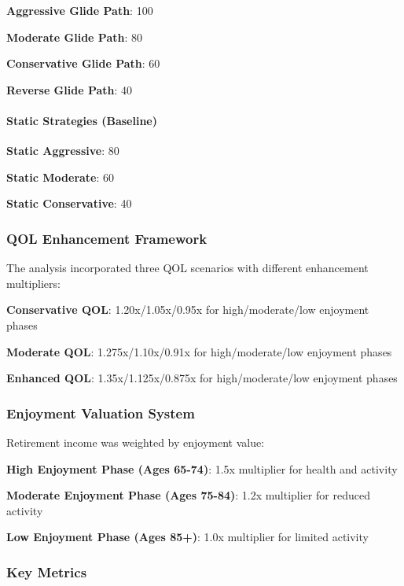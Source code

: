 \documentclass[11pt,letterpaper]{article}
\begin{document}
{{{\item \textbf{Aggressive Glide Path}: 100%
\item \textbf{Moderate Glide Path}: 80%
\item \textbf{Conservative Glide Path}: 60%
\item \textbf{Reverse Glide Path}: 40%

\paragraph{Static Strategies (Baseline)}

\item \textbf{Static Aggressive}: 80%
\item \textbf{Static Moderate}: 60%
\item \textbf{Static Conservative}: 40%

\subsubsection{QOL Enhancement Framework}

The analysis incorporated three QOL scenarios with different enhancement multipliers:

\item \textbf{Conservative QOL}: 1.20x/1.05x/0.95x for high/moderate/low enjoyment phases
\item \textbf{Moderate QOL}: 1.275x/1.10x/0.91x for high/moderate/low enjoyment phases
\item \textbf{Enhanced QOL}: 1.35x/1.125x/0.875x for high/moderate/low enjoyment phases

\subsubsection{Enjoyment Valuation System}

Retirement income was weighted by enjoyment value:

\item \textbf{High Enjoyment Phase (Ages 65-74)}: 1.5x multiplier for health and activity
\item \textbf{Moderate Enjoyment Phase (Ages 75-84)}: 1.2x multiplier for reduced activity
\item \textbf{Low Enjoyment Phase (Ages 85+)}: 1.0x multiplier for limited activity

\subsubsection{Key Metrics}

}}}
\end{document}
